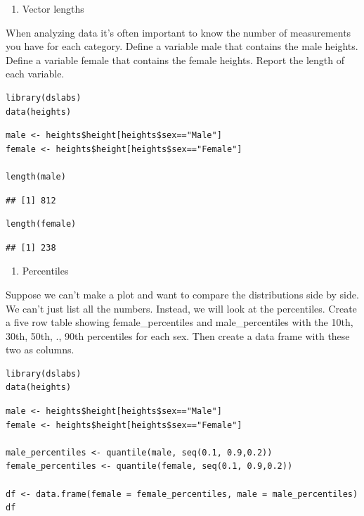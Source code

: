 \documentclass[
]{article}
\providecommand{\tightlist}{%
  \setlength{\itemsep}{0pt}\setlength{\parskip}{0pt}}
\begin{document}
\begin{enumerate}
\def\labelenumi{\arabic{enumi}.}
\tightlist
\item
  Vector lengths
\end{enumerate}

When analyzing data it's often important to know the number of
measurements you have for each category. Define a variable male that
contains the male heights. Define a variable female that contains the
female heights. Report the length of each variable.

\begin{verbatim}
library(dslabs)
data(heights)
\end{verbatim}

\begin{verbatim}
male <- heights$height[heights$sex=="Male"]
female <- heights$height[heights$sex=="Female"]

length(male)
\end{verbatim}

\begin{verbatim}
## [1] 812
\end{verbatim}

\begin{verbatim}
length(female)
\end{verbatim}

\begin{verbatim}
## [1] 238
\end{verbatim}

\begin{enumerate}
\def\labelenumi{\arabic{enumi}.}
\setcounter{enumi}{1}
\tightlist
\item
  Percentiles
\end{enumerate}

Suppose we can't make a plot and want to compare the distributions side
by side. We can't just list all the numbers. Instead, we will look at
the percentiles. Create a five row table showing female\_percentiles and
male\_percentiles with the 10th, 30th, 50th, ., 90th percentiles for
each sex. Then create a data frame with these two as columns.

\begin{verbatim}
library(dslabs)
data(heights)
\end{verbatim}

\begin{verbatim}
male <- heights$height[heights$sex=="Male"]
female <- heights$height[heights$sex=="Female"]

male_percentiles <- quantile(male, seq(0.1, 0.9,0.2))
female_percentiles <- quantile(female, seq(0.1, 0.9,0.2))

df <- data.frame(female = female_percentiles, male = male_percentiles)
df
\end{verbatim}
\end{document}

